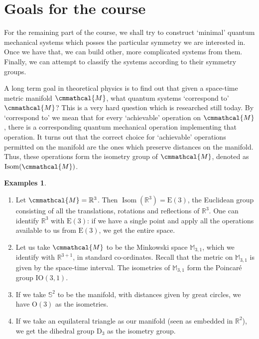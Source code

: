 \documentclass[a4 paper, 12pt]{book}
\renewcommand{\mathcal}{\cmmathcal}
\theoremstyle{definition}
\newtheorem{examples}[theorem]{Examples}
\newcommand{\rr}{\mathbb{R}}
\renewcommand{\ss}{\mathbb{S}}
\newcommand{\mm}{\mathbb{M}}
\newcommand{\ortho}{\mathrm{O}}
\newcommand{\man}{\mathcal{M}}
\newcommand{\euc}{\mathrm{E}}
\DeclareMathOperator{\isom}{Isom}
\newcommand{\mink}{\mm_{3,1}}
\newcommand{\poin}{\mathrm{IO}(3,1)}
\begin{document}
	\section{Goals for the course}

	For the remaining part of the course, we shall try to construct `minimal' quantum mechanical systems which posses the particular symmetry we are interested in. Once we have that, we can build other, more complicated systems from them. Finally, we can attempt to classify the systems according to their symmetry groups.

	A long term goal in theoretical physics is to find out that given a space-time metric manifold \(\man\), what quantum systems `correspond to' \(\man\)? This is a very hard question which is researched still today. By `correspond to' we mean that for every `achievable' operation on \(\man\), there is a corresponding quantum mechanical operation implementing that operation. It turns out that the correct choice for `achievable' operations permitted on the manifold are the ones which preserve distances on the manifold. Thus, these operations form the isometry group of \(\man\), denoted as \(\isom(\man)\).
	\begin{examples}
		\leavevmode \vspace{-\baselineskip}\vspace{12pt}
		\begin{enumerate}
		    \item Let \(\man = \rr^3\). Then \(\isom(\rr^3) = \euc(3)\), the Euclidean group consisting of all the translations, rotations and reflections of \(\rr^3\). One can identify \(\rr^3\) with \(\euc(3)\): if we have a single point and apply all the operations available to us from \(\euc(3)\), we get the entire space.
			\item Let us take \(\man\) to be the Minkowski space \(\mink\), which we identify with \(\rr^{3+1}\), in standard co-ordinates. Recall that the metric on \(\mink\) is given by the space-time interval. The isometries of \(\mink\) form the Poincaré group \(\poin\).
			\item If we take \(\ss^2\) to be the manifold, with distances given by great circles, we have \(\ortho(3)\) as the isometries.
			\item If we take an equilateral triangle as our manifold (seen as embedded in \(\rr^2\)), we get the dihedral group \(\mathrm{D}_3\) as the isometry group.
		\end{enumerate}
	\end{examples}
\end{document}
